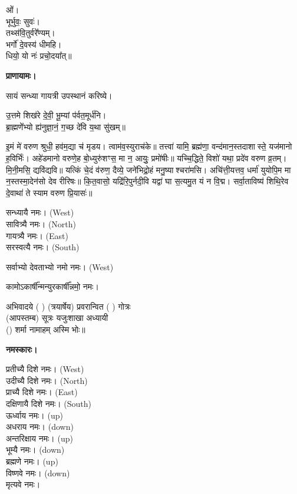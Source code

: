 ओं।\\
भूर्भुवः॒ सुवः॑।\\
तथ्स॑वि॒तुर्वरे᳚ण्यम्।\\
भर्गो॑ दे॒वस्य॑ धीमहि।\\
धियो॒ यो नः॑ प्रचो॒दया᳚त्॥

\textbf{प्राणायामः।}


सायं सन्ध्या गायत्री उपस्थानं करिष्ये।

उ॒त्तमे शिख॑रे दे॒वी॒ भू॒म्यां प॑र्वत॒मूर्ध॑नि।\\
ब्रा॒ह्मणे॑॑भ्यो ह्य॑नुज्ञा॒नं॒ ग॒च्छ दे॑वि य॒था सु॑खम्॥


इ॒मं मे॑ वरुण श्रुधी॒ हव॑म॒द्या च॑ मृडय। त्वाम॑व॒स्युराच॑के॥ तत्त्वा॑ यामि॒ ब्रह्म॑णा॒ वन्द॑मान॒स्तदाशास्ते॒ यज॑मानो ह॒विर्भिः॑। अहे॑डमानो वरुणे॒ह बो॒ध्युरु॑शꣳस॒ मा न॒ आयुः॒ प्रमो॑षीः॥
यच्चि॒द्धिते॒ विशो॑ यथा॒ प्रदे॑व वरुण व्र॒तम्। मि॒नी॒मसि॒ द्यवि॑द्यवि॥ यत्किं चे॒दं व॑रुण॒ दैव्ये॒ जने॑भिद्रो॒हं मनु॒ष्याश्चरा॑मसि। अचि॑त्ती॒यत्तव॒ धर्मा॑ युयोपि॒म मा न॒स्तस्मा॒देन॑सो देव रीरिषः॥ कि॒त॒वासो॒ यद्रि॑रि॒पुर्नदी॒वि यद्वा॑ घा स॒त्यमु॒त यं न वि॒द्म। सर्वा॒ताविष्य॑ शिथि॒रेव दे॒वाथा॑ ते स्याम वरुण प्रि॒यासः॑॥


सन्ध्यायै नमः।  {\scriptsize (West)}\\
सावित्र्यै नमः। {\scriptsize (North)}\\
गायत्र्यै नमः।  {\scriptsize (East)}\\
सरस्वत्यै नमः।  {\scriptsize (South)}

सर्वाभ्यो देवताभ्यो नमो नमः। {\scriptsize (West)}

कामोऽकार्\mbox{}षी᳚न्मन्युरकार्\mbox{}षी᳚न्नमो॒ नमः।

अभिवादये ( ) (त्रयार्षेय) प्रवरान्वित ( ) गोत्रः\\
(आपस्तम्ब) सूत्रः यजुःशाखा अध्यायी\\
() शर्मा नामाहम् अस्मि भोः॥

\textbf{नमस्कारः।}


प्रतीच्यै दिशे नमः।   {\scriptsize (West)}\\
उदीच्यै दिशे नमः।   {\scriptsize (North)}\\
प्राच्यै दिशे नमः।   {\scriptsize (East)}\\
दक्षिणायै दिशे नमः।  {\scriptsize (South)}\\
ऊर्ध्वाय नमः।   {\scriptsize (up)}\\
अधराय नमः।   {\scriptsize (down)}\\
अन्तरिक्षाय नमः। {\scriptsize (up)}\\
भूम्यै नमः। {\scriptsize (down)}\\
ब्रह्मणे नमः। {\scriptsize (up)}\\
विष्णवे नमः।  {\scriptsize (down)}\\
मृत्यवे नमः।

